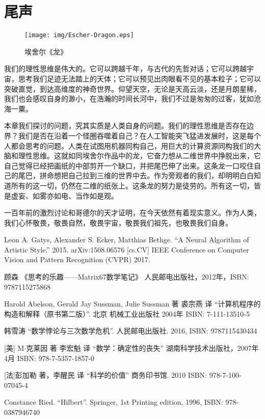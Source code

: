 \documentclass{article}
\begin{document}
\section{尾声}

\begin{wrapfigure}{R}{0.6\textwidth}
 \centering
 \texttt{[image: img/Escher-Dragon.eps]}
 \caption{埃舍尔《龙》}
 \label{fig:Escher-Dragon}
\end{wrapfigure}

我们的理性思维是伟大的。它可以跨越千年，与古代的先哲对话；它可以跨越宇宙，思考我们足迹无法踏上的天体；它可以预见出肉眼看不见的基本粒子；它可以突破直觉，到达高维度的神奇世界。仰望天空，无论是天高云淡，还是月朗星稀，我们也会感叹自身的渺小，在浩瀚的时间长河中，我们不过是匆匆的过客，犹如沧海一粟。

本章我们探讨的问题，究其实质是人类自身的问题。我们的理性思维是否存在边界？我们是否在沿着一个怪圈吞噬着自己？在人工智能突飞猛进发展时，这是每个人都会思考的问题。人类在试图用机器同构自己，用巨大的计算资源同构我们的大脑和理性思维。这就如同埃舍尔作品中的龙，它奋力想从二维世界中挣脱出来，它自己觉得已经把画纸的中部剪开一个缺口，并把尾巴伸了出来。这条龙一口咬住自己的尾巴，拼命想把自己拉到三维的世界中去。作为旁观者的我们，却明明白白知道所有的这一切，仍然在二维的纸张上。这条龙的努力是徒劳的。所有这一切，皆是虚妄、如雾亦如电、当作如是观。

一百年前的激烈讨论和哥德尔的天才证明，在今天依然有着现实意义。作为人类，我们心怀敬畏，敬畏自然，敬畏宇宙，敬畏我们祖先，也敬畏我们自身。

\ifx\wholebook\relax \else
\begin{thebibliography}{99}

Leon A. Gatys, Alexander S. Ecker, Matthias Bethge. ``A Neural Algorithm of Artistic Style.'' 2015. arXiv:1508.06576 [cs.CV] IEEE Conference on Computer Vision and Pattern Recognition (CVPR) 2017.

顾森 《思考的乐趣——Matrix67数学笔记》 人民邮电出版社，2012年，ISBN: 9787115275868

Harold Abelson, Gerald Jay Sussman, Julie Sussman 著 裘宗燕 译 ``计算机程序的构造和解释（原书第二版）''. 北京 机械工业出版社 2004年 ISBN: 7-111-13510-5

韩雪涛 ``数学悖论与三次数学危机''. 人民邮电出版社. 2016, ISBN: 9787115430434

[美] M$\cdot$克莱因 著 李宏魁 译 ``数学：确定性的丧失'' 湖南科学技术出版社，2007年4月 ISBN: 978-7-5357-1857-0

[法]彭加勒 著，李醒民 译 ``科学的价值'' 商务印书馆. 2010 ISBN: 978-7-100-07045-4

Constance Ried. ``Hilbert''. Springer, 1st Printing edition, 1996, ISBN: 978-0387946740

\end{thebibliography}

\expandafter\enddocument

\fi
\end{document}
